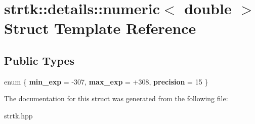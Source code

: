 \hypertarget{structstrtk_1_1details_1_1numeric_3_01double_01_4}{\section{strtk\-:\-:details\-:\-:numeric$<$ double $>$ Struct Template Reference}
\label{structstrtk_1_1details_1_1numeric_3_01double_01_4}
}
\subsection*{Public Types}
\begin{DoxyCompactItemize}
\item 
enum \{ {\bfseries min\-\_\-exp} = -\/307, 
{\bfseries max\-\_\-exp} = +308, 
{\bfseries precision} = 15
 \}
\end{DoxyCompactItemize}


The documentation for this struct was generated from the following file\-:\begin{DoxyCompactItemize}
\item 
strtk.\-hpp\end{DoxyCompactItemize}

